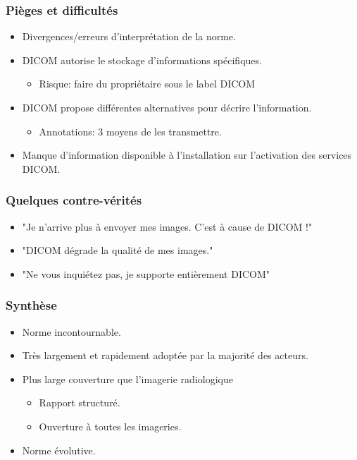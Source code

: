 \frame
{
	\frametitle{Pi\`eges et difficult\'es}
	\begin{itemize}
		\item Divergences/erreurs d'interpr\'etation de la norme.
		\item<2-> DICOM autorise le stockage d'informations sp\'ecifiques.
		\begin{itemize}
			\item<3-> Risque: faire du propri\'etaire sous le label DICOM
		\end{itemize}
		\item<4-> DICOM propose diff\'erentes alternatives pour d\'ecrire l'information.
		\begin{itemize}
			\item<5-> Annotations: 3 moyens de les transmettre.
		\end{itemize}
		\item<6-> Manque d'information disponible \`a l'installation sur l'activation des services DICOM.
	\end{itemize}
}

\frame
{
	\frametitle{Quelques contre-v\'erit\'es}
	\begin{itemize}
		\item "Je n'arrive plus \`a envoyer mes images. C'est \`a cause de DICOM !"
		\item<3-> "DICOM d\'egrade la qualit\'e de mes images."
		\item<5-> "Ne vous inqui\'etez pas, je supporte enti\`erement DICOM"
	\end{itemize}
}

\frame
{
	\frametitle{Synth\`ese}
	\begin{itemize}
		\item<1-> Norme incontournable.
		\item<2-> Tr\`es largement et rapidement adopt\'ee par la majorit\'e des acteurs.
		\item<3-> Plus large couverture que l'imagerie radiologique
		\begin{itemize}
			\item<4-> Rapport structur\'e.
			\item<5-> Ouverture \`a toutes les imageries.
		\end{itemize}
		\item<6-> Norme \'evolutive.
	\end{itemize}
}
